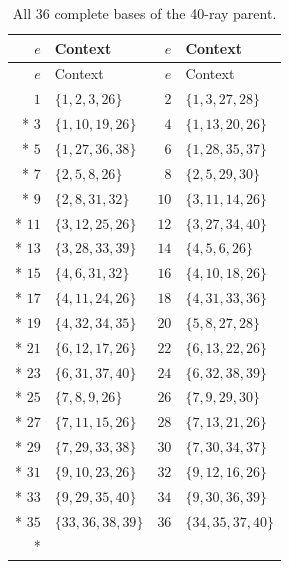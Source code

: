\documentclass[aps,pra,reprint,superscriptaddress,longbibliography,nofootinbib,floatfix,10pt]{revtex4-2}
\theoremstyle{definition}
\begin{document}
\begin{longtable}{rlrl}
\caption{All 36 complete bases of the 40-ray parent.}\label{tab:parent40-contexts}\\
\toprule
$e$ & Context & $e$ & Context\\\midrule
\endfirsthead
\toprule
$e$ & Context & $e$ & Context\\\midrule
\endhead
\bottomrule\endfoot
$1$ & $\{1,2,3,26\}$ & $2$ & $\{1,3,27,28\}$\\*
$3$ & $\{1,10,19,26\}$ & $4$ & $\{1,13,20,26\}$\\*
$5$ & $\{1,27,36,38\}$ & $6$ & $\{1,28,35,37\}$\\*
$7$ & $\{2,5,8,26\}$ & $8$ & $\{2,5,29,30\}$\\*
$9$ & $\{2,8,31,32\}$ & $10$ & $\{3,11,14,26\}$\\*
$11$ & $\{3,12,25,26\}$ & $12$ & $\{3,27,34,40\}$\\*
$13$ & $\{3,28,33,39\}$ & $14$ & $\{4,5,6,26\}$\\*
$15$ & $\{4,6,31,32\}$ & $16$ & $\{4,10,18,26\}$\\*
$17$ & $\{4,11,24,26\}$ & $18$ & $\{4,31,33,36\}$\\*
$19$ & $\{4,32,34,35\}$ & $20$ & $\{5,8,27,28\}$\\*
$21$ & $\{6,12,17,26\}$ & $22$ & $\{6,13,22,26\}$\\*
$23$ & $\{6,31,37,40\}$ & $24$ & $\{6,32,38,39\}$\\*
$25$ & $\{7,8,9,26\}$ & $26$ & $\{7,9,29,30\}$\\*
$27$ & $\{7,11,15,26\}$ & $28$ & $\{7,13,21,26\}$\\*
$29$ & $\{7,29,33,38\}$ & $30$ & $\{7,30,34,37\}$\\*
$31$ & $\{9,10,23,26\}$ & $32$ & $\{9,12,16,26\}$\\*
$33$ & $\{9,29,35,40\}$ & $34$ & $\{9,30,36,39\}$\\*
$35$ & $\{33,36,38,39\}$ & $36$ & $\{34,35,37,40\}$\\*
\end{longtable}
\endgroup
\begingroup\small
{}
\end{document}
